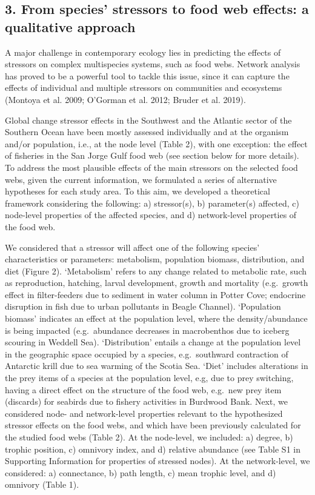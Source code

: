 \documentclass[
]{article}
\begin{document}
\normalsize

\subsection{3. From species' stressors to food web effects: a
qualitative
approach}\label{from-species-stressors-to-food-web-effects-a-qualitative-approach}

A major challenge in contemporary ecology lies in predicting the effects
of stressors on complex multispecies systems, such as food webs. Network
analysis has proved to be a powerful tool to tackle this issue, since it
can capture the effects of individual and multiple stressors on
communities and ecosystems (Montoya et al. 2009; O'Gorman et al. 2012;
Bruder et al. 2019).

Global change stressor effects in the Southwest and the Atlantic sector
of the Southern Ocean have been mostly assessed individually and at the
organism and/or population, i.e., at the node level (Table 2), with one
exception: the effect of fisheries in the San Jorge Gulf food web (see
section below for more details). To address the most plausible effects
of the main stressors on the selected food webs, given the current
information, we formulated a series of alternative hypotheses for each
study area. To this aim, we developed a theoretical framework
considering the following: a) stressor(s), b) parameter(s) affected, c)
node-level properties of the affected species, and d) network-level
properties of the food web.

We considered that a stressor will affect one of the following species'
characteristics or parameters: metabolism, population biomass,
distribution, and diet (Figure 2). `Metabolism' refers to any change
related to metabolic rate, such as reproduction, hatching, larval
development, growth and mortality (e.g.~growth effect in filter-feeders
due to sediment in water column in Potter Cove; endocrine disruption in
fish due to urban pollutants in Beagle Channel). `Population biomass'
indicates an effect at the population level, where the density/abundance
is being impacted (e.g.~abundance decreases in macrobenthos due to
iceberg scouring in Weddell Sea). `Distribution' entails a change at the
population level in the geographic space occupied by a species,
e.g.~southward contraction of Antarctic krill due to sea warming of the
Scotia Sea. `Diet' includes alterations in the prey items of a species
at the population level, e.g, due to prey switching, having a direct
effect on the structure of the food web, e.g.~new prey item (discards)
for seabirds due to fishery activities in Burdwood Bank. Next, we
considered node- and network-level properties relevant to the
hypothesized stressor effects on the food webs, and which have been
previously calculated for the studied food webs (Table 2). At the
node-level, we included: a) degree, b) trophic position, c) omnivory
index, and d) relative abundance (see Table S1 in Supporting Information
for properties of stressed nodes). At the network-level, we considered:
a) connectance, b) path length, c) mean trophic level, and d) omnivory
(Table 1).
\end{document}

